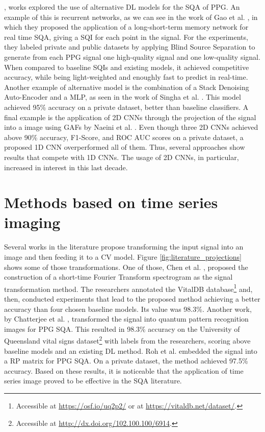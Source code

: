 , works explored the use of alternative \gls{DL} models for the \gls{SQA} of \gls{PPG}. An example of this is recurrent networks, as we can see in the work of Gao et al. \cite{deep-learning-4}, in which they proposed the application of a long-short-term memory network for real time \gls{SQA}, giving a \gls{SQI} for each point in the signal. For the experiments, they labeled private and public datasets by applying Blind Source Separation to generate from each \gls{PPG} signal one high-quality signal and one low-quality signal. When compared to baseline \gls{SQI}s and existing models, it achieved competitive accuracy, while being light-weighted and enoughly fast to predict in real-time. Another example of alternative model is the combination of a Stack Denoising Auto-Encoder and a \gls{MLP}, as seen in the work of Singha et al. \cite{deep-learning-5}. This model achieved 95\% accuracy on a private dataset, better than baseline classifiers. A final example is the application of 2D \glspl{CNN} through the projection of the signal into a image using \glspl{GAF} by Naeini et al. \cite{deep-learning-6}. Even though three 2D \glspl{CNN} achieved above 90\% accuracy, F1-Score, and \gls{ROC AUC} scores on a private dataset, a proposed 1D \gls{CNN} overperformed all of them. Thus, several approaches show results that compete with 1D \glspl{CNN}. The usage of 2D \glspl{CNN}, in particular, increased in interest in this last decade.


\section{Methods based on time series imaging}
\label{sec:imaging}

Several works in the literature propose transforming the input signal into an image and then feeding it to a \gls{CV} model. Figure \ref{fig:literature_projections} shows some of those transformations.  One of those, Chen et al. \cite{imaging-1}, proposed the construction of a short-time Fourier Transform spectrogram as the signal transformation method. The researchers annotated the VitalDB database\footnote{Accessible at \url{https://osf.io/uq2p2/} or at \url{https://vitaldb.net/dataset/}.} \cite{vitaldb-dataset} and, then, conducted experiments that lead to the proposed method achieving a better accuracy than four chosen baseline models. Its value was 98.3\%. Another work, by Chatterjee et al. \cite{imaging-2}, transformed the signal into quantum pattern recognition images for PPG \gls{SQA}. This resulted in 98.3\% accuracy on the University of Queensland vital signs dataset\footnote{Accessible at \url{http://dx.doi.org/102.100.100/6914}.} \cite{queensland-dataset} with labels from the researchers, scoring above baseline models and an existing \gls{DL} method. Roh et al. \cite{imaging-3} embedded the signal into a \gls{RP} matrix for PPG \gls{SQA}. On a private dataset, the method achieved 97.5\% accuracy. Based on these results, it is noticeable that the application of time series image proved to be effective in the \gls{SQA} literature.

